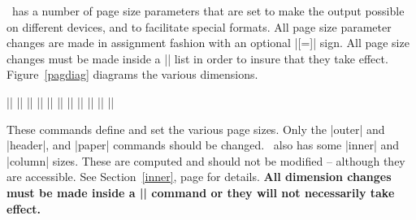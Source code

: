  \relax \fi %

\def\cqu{\cquote{It is when I am struggling to be brief that
I become unintelligible.}{Ars Poetica, Horace (65-8~BC)}
}

\intex\ has a number of page size parameters that are set to make the output
possible on different devices, and to facilitate special formats. 
All page size
parameter changes are made in assignment fashion with an optional |[=]| sign.
All page size changes must be made inside a 
\@|\documentstyle| list in order to insure that they take effect.
Figure~\ref{pagdiag} diagrams the various dimensions.

 
\beginpageinsert
{}
\endpageinsert

\beginthreecolumn
\hfuzz=20pt
\ext\@|\documentstyle|
\ext\@|\houterpagesize|
\ext\@|\hpapersize|
\ext\@|\leftmarginsize|
\ext\@|\leftmarginskip|
\pri|\mag|
\pla|\magstep|
\ext\@|\topmarginsize|
\ext\@|\topmarginskip|
\ext\@|\vouterpagesize|
\ext\@|\vpapersize|
\endthreecolumn

These commands define and set the various page sizes. Only the |outer| and
|header|, and |paper| commands should be changed. 
\intex\ also has some |inner| and |column| sizes. These are computed and
should not be modified -- although they are accessible. See
Section~{\ref{inner}}, page  for details. 
{\bf All dimension changes must be made inside a |\documentstyle| command or
they  will not necessarily take effect.}


